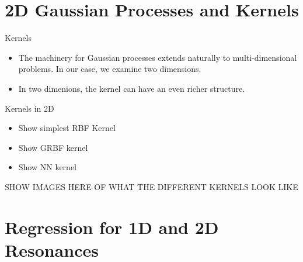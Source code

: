 \documentclass[10pt]{beamer}
\begin{document}
\section[2D Regression]{2D Gaussian Processes and Kernels}
\label{sec:2d-gauss-proc}
\begin{frame}{Kernels}
  \begin{itemize}
  \item The machinery for Gaussian processes extends naturally to multi-dimensional problems. In our case, we examine two dimensions.
  \item In two dimenions, the kernel can have an even richer structure. 
  \end{itemize}

  \begin{center}
  \end{center}

\end{frame}

\begin{frame}{Kernels in 2D}
  \begin{itemize}
  \item Show simplest RBF Kernel
  \item Show GRBF kernel
  \item Show NN kernel
  \end{itemize}

  SHOW IMAGES HERE OF WHAT THE DIFFERENT KERNELS LOOK LIKE
\end{frame}

\section[Results]{Regression for 1D and 2D Resonances}
\label{sec:results-1d-2d}
\end{document}
